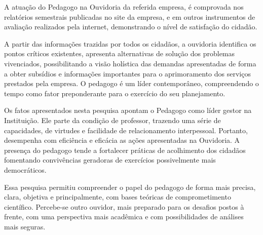 \begin{refsection}
    A atuação do Pedagogo na Ouvidoria da referida empresa, é comprovada nos relatórios semestrais publicadas no site da empresa, e em outros instrumentos de avaliação realizados pela internet, demonstrando o nível de satisfação do cidadão. 

    A partir das informações trazidas por todos os cidadãos, a ouvidoria identifica os pontos críticos existentes, apresenta alternativas de solução dos problemas vivenciados, possibilitando a visão holística das demandas apresentadas de forma a obter subsídios e informações importantes para o aprimoramento dos serviços prestados pela empresa. O pedagogo é um líder contemporâneo, compreendendo o tempo como fator preponderante para o exercício do seu planejamento.  

    Os fatos apresentados nesta pesquisa apontam o Pedagogo como líder gestor na Instituição. Ele parte da condição de professor, trazendo uma série de capacidades, de virtudes e facilidade de relacionamento interpessoal. Portanto, desempenha com eficiência e eficácia as ações apresentadas na Ouvidoria. A presença do pedagogo tende a fortalecer práticas de acolhimento dos cidadãos fomentando convivências geradoras de exercícios possivelmente mais democráticos. 

    Essa pesquisa permitiu compreender o papel do pedagogo de forma mais precisa, clara, objetiva e principalmente, com bases teóricas de comprometimento científico. Percebe-se outro ouvidor, mais preparado para os desafios postos à frente, com uma perspectiva mais acadêmica e com possibilidades de análises mais seguras. 

    \printbibliography[heading=subbibliography,notcategory=fullcited]

    \label{chap:reflexao-pedagogoend}

\end{refsection}
